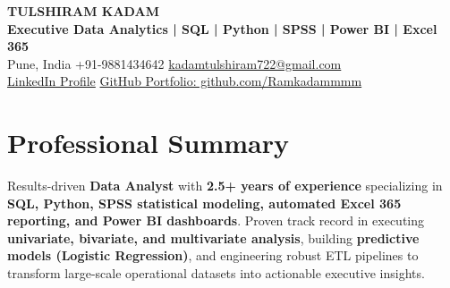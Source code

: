 \documentclass[a4paper,10pt]{article}
\begin{document}
\begin{center}
    {\Huge \bfseries \color{primary} TULSHIRAM KADAM} \\[4pt]
    {\bfseries Executive Data Analytics | SQL | Python | SPSS | Power BI | Excel 365} \\[4pt]
    \small Pune, India \quad \textbullet \quad +91-9881434642 \quad \textbullet \quad \href{mailto:kadamtulshiram722@gmail.com}{kadamtulshiram722@gmail.com} \\
    \small \href{https://linkedin.com/in/tulshiram-kadam}{LinkedIn Profile} \quad \textbullet \quad \href{https://github.com/Ramkadammmm}{GitHub Portfolio: github.com/Ramkadammmm}
\end{center}
\vspace{-4pt}

\section{Professional Summary}
Results-driven \textbf{Data Analyst} with \textbf{2.5+ years of experience} specializing in \textbf{SQL, Python, SPSS statistical modeling, automated Excel 365 reporting, and Power BI dashboards}. Proven track record in executing \textbf{univariate, bivariate, and multivariate analysis}, building \textbf{predictive models (Logistic Regression)}, and engineering robust ETL pipelines to transform large-scale operational datasets into actionable executive insights.

\vspace{4pt}

\end{document}
